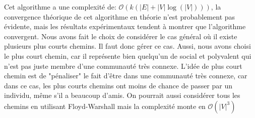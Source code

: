 \documentclass{article}
\begin{document}
Cet algorithme a une complexité de: $\mathcal O(k(|E| + |V| \log(|V|)))$, la convergence théorique de cet algorithme en théorie n'est probablement pas évidente, mais les résultats expérimentaux tendent à montrer que l'algorithme convergent.
Nous avons fait le choix de considérer le cas général où il existe plusieurs plus courts chemins. Il faut donc gérer ce cas.
Aussi, nous avons choisi le plus court chemin, car il représente bien quelqu'un de social et polyvalent qui n'est pas juste membre d'une communauté très connexe.
L'idée de plus court chemin est de "pénaliser" le fait d'être dans une communauté très connexe, car dans ce cas, les plus courts chemins ont moins de chance de passer par un individu, même s'il a beaucoup d'amis.
On pourrait aussi considérer tous les chemins en utilisant Floyd-Warshall mais la complexité monte en $\mathcal O(|V|^3)$
\end{document}
